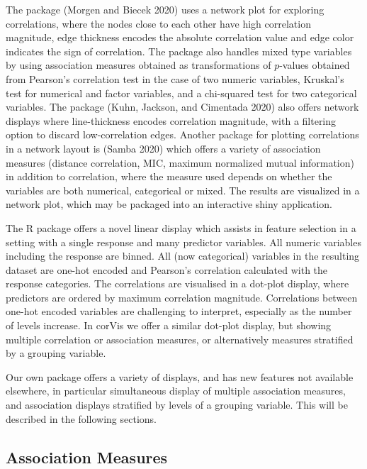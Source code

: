 The package  (Morgen and Biecek 2020) uses a network plot for exploring correlations, where the nodes close to each other have high correlation magnitude, edge thickness encodes the absolute correlation value and edge color indicates the sign of correlation. The package also handles mixed type variables by using association measures obtained as transformations of \(p\)-values obtained from Pearson's correlation test in the case of two numeric variables, Kruskal's test for numerical and factor variables, and a chi-squared test for two categorical variables. The package  (Kuhn, Jackson, and Cimentada 2020) also offers network displays where line-thickness encodes correlation magnitude, with a filtering option to discard low-correlation edges. Another package for plotting correlations in a network layout is  (Samba 2020) which offers a variety of association measures (distance correlation, MIC, maximum normalized mutual information) in addition to correlation, where the measure used depends on whether the variables are both numerical, categorical or mixed. The results are visualized in a network plot, which may be packaged into an interactive shiny application.

The R package  offers a novel linear display which assists in feature selection in a setting with a single response and many predictor variables. All numeric variables including the response are binned. All (now categorical) variables in the resulting dataset are one-hot encoded and Pearson's correlation calculated with the response categories. The correlations are visualised in a dot-plot display, where predictors are ordered by maximum correlation magnitude. Correlations between one-hot encoded variables are challenging to interpret, especially as the number of levels increase. In corVis we offer a similar dot-plot display, but showing multiple correlation or association measures, or alternatively measures stratified by a grouping variable.

Our own package  offers a variety of displays, and has new features not available elsewhere, in particular simultaneous display of multiple association measures, and association displays stratified by levels of a grouping variable. This will be described in the following sections.

\hypertarget{association-measures}{%
\subsection{Association Measures}\label{association-measures}}

